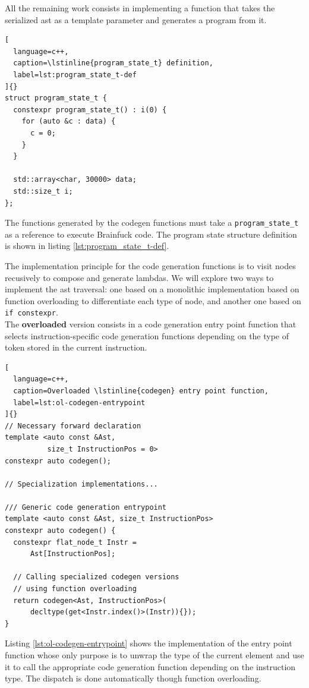 \documentclass[../main]{subfiles}
\begin{document}
All the remaining work consists in implementing a function that takes the
serialized \gls{ast} as a template parameter and generates a program from it.

\begin{lstlisting}[
  language=c++,
  caption=\lstinline{program_state_t} definition,
  label=lst:program_state_t-def
]{}
struct program_state_t {
  constexpr program_state_t() : i(0) {
    for (auto &c : data) {
      c = 0;
    }
  }

  std::array<char, 30000> data;
  std::size_t i;
};
\end{lstlisting}

The functions generated by the codegen functions must take a
\lstinline{program_state_t} as a reference to execute Brainfuck code.
The program state structure definition is shown in listing
\ref{lst:program_state_t-def}.

The implementation principle for the code generation functions is to visit
nodes recusively to compose and generate lambdas.
We will explore two ways to implement the \gls{ast} traversal:
one based on a monolithic implementation based on function overloading
to differentiate each type of node, and another one based on
\lstinline{if constexpr}.
\\


The \textbf{overloaded} version consists in a code generation entry point function
that selects instruction-specific code generation functions depending
on the type of token stored in the current instruction.

\begin{lstlisting}[
  language=c++,
  caption=Overloaded \lstinline{codegen} entry point function,
  label=lst:ol-codegen-entrypoint
]{}
// Necessary forward declaration
template <auto const &Ast,
          size_t InstructionPos = 0>
constexpr auto codegen();

// Specialization implementations...

/// Generic code generation entrypoint
template <auto const &Ast, size_t InstructionPos>
constexpr auto codegen() {
  constexpr flat_node_t Instr =
      Ast[InstructionPos];

  // Calling specialized codegen versions
  // using function overloading
  return codegen<Ast, InstructionPos>(
      decltype(get<Instr.index()>(Instr)){});
}
\end{lstlisting}

Listing \ref{lst:ol-codegen-entrypoint} shows the implementation
of the entry point function whose only purpose is to unwrap the type
of the current element and use it to call the appropriate code generation
function depending on the instruction type.
The dispatch is done automatically though function overloading.
\end{document}

